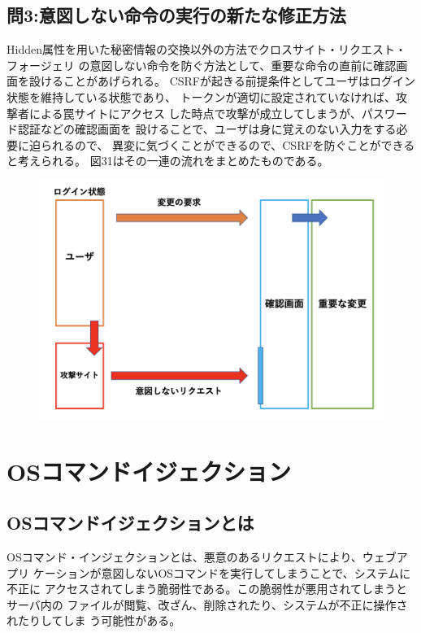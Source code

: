 \documentclass[dvipdfmx,autodetect-engine,titlepage]{jsarticle}
\begin{document}
\subsection{問3:意図しない命令の実行の新たな修正方法}
Hidden属性を用いた秘密情報の交換以外の方法でクロスサイト・リクエスト・フォージェリ
の意図しない命令を防ぐ方法として、重要な命令の直前に確認画面を設けることがあげられる。
CSRFが起きる前提条件としてユーザはログイン状態を維持している状態であり、
トークンが適切に設定されていなければ、攻撃者による罠サイトにアクセス
した時点で攻撃が成立してしまうが、パスワード認証などの確認画面を
設けることで、ユーザは身に覚えのない入力をする必要に迫られるので、
異変に気づくことができるので、CSRFを防ぐことができると考えられる。
図31はその一連の流れをまとめたものである。

\begin{figure}[h]
  \centering
  \includegraphics[scale=0.35]{pic35.png}
  \caption{}
\end{figure}


\section{OSコマンドイジェクション}

\subsection{OSコマンドイジェクションとは}
OSコマンド・インジェクションとは、悪意のあるリクエストにより、ウェブアプリ
ケーションが意図しないOSコマンドを実行してしまうことで、システムに不正に
アクセスされてしまう脆弱性である。この脆弱性が悪用されてしまうとサーバ内の
ファイルが閲覧、改ざん、削除されたり、システムが不正に操作されたりしてしま
う可能性がある。
\end{document}
